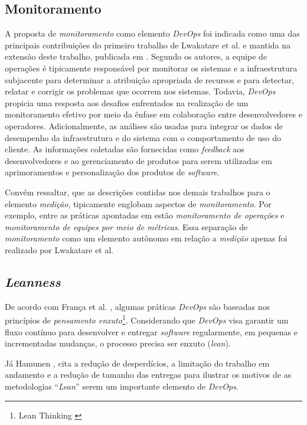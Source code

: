 \subsection{Monitoramento}

A proposta de \emph{monitoramento} como elemento \textit{DevOps} foi indicada
como uma das principais contribuições do primeiro trabalho de Lwakatare et al.
\cite{dimensions_of_devops} e mantida na extensão deste trabalho, publicada
em \cite{extending_dimensions}. Segundo os autores, a equipe de
operações é tipicamente responsável por monitorar os sistemas e a
infraestrutura subjacente para determinar a atribuição apropriada de recursos e
para detectar, relatar e corrigir os problemas que ocorrem nos sistemas.
Todavia, \textit{DevOps} propicia uma resposta aos desafios enfrentados na
realização de um monitoramento efetivo por meio da ênfase em colaboração entre
desenvolvedores e operadores. Adicionalmente, as análises são usadas para
integrar os dados de desempenho da infraestrutura e do sistema com o
comportamento de uso do cliente. As informações coletadas são fornecidas como
\textit{feedback} aos desenvolvedores e ao gerenciamento de produtos para serem
utilizadas em aprimoramentos e personalização dos produtos de \textit{software}.

Convém ressaltar, que as descrições contidas nos demais trabalhos para o
elemento \emph{medição}, tipicamente englobam aspectos de \emph{monitoramento}.
Por exemplo, entre as práticas apontadas em \cite{characterizing_devops} estão
\emph{monitoramento de operações} e \emph{monitoramento de equipes por meio de
métricas}. Essa separação de \emph{monitoramento} como um elemento autônomo em
relação a \emph{medição} apenas foi realizado por Lwakatare et al.

\subsection{\textit{Leanness}}

De acordo com França et al. \cite{characterizing_devops}, algumas práticas
\textit{DevOps} são baseadas nos princípios de \emph{pensamento enxuto}\footnote{Lean
Thinking \cite{lean_thinking}}. Considerando que \textit{DevOps} visa garantir
um fluxo contínuo para desenvolver e entregar {\it software} regularmente, em
pequenas e incrementadas mudanças, o processo precisa ser enxuto (\textit{lean}).

Já Hamunen \cite{challenges_in_adopting_devops}, cita a redução de desperdícios,
a limitação do trabalho em andamento e a redução de tamanho das entregas para
ilustrar os motivos de as metodologias ``{\it Lean}'' serem um importante
elemento de {\it DevOps}.

